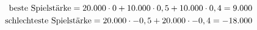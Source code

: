 \begin{equation}
\label{eq:spielstaerke_intervall}
\equationentry{Berechnung des Intervalls der Spielstärke}
\begin{split}
    \text{beste Spielstärke} = 20.000 \cdot 0 + 10.000 \cdot 0,5 + 10.000 \cdot 0,4 = 9.000 \\
    \text{schlechteste Spielstärke} = 20.000 \cdot -0,5 + 20.000 \cdot -0,4 = -18.000
\end{split}
\end{equation}